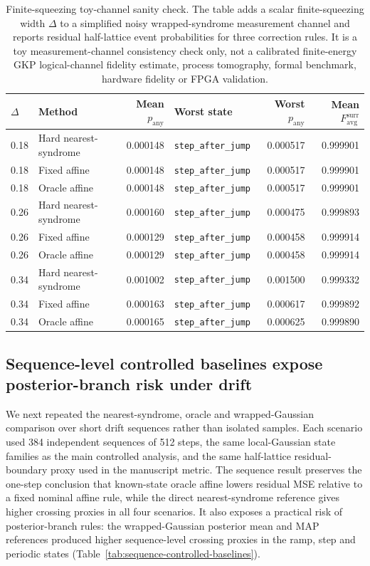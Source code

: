 \documentclass[11pt]{article}
\begin{document}
\begin{table}[t]
\centering
\small
\begin{tabular}{@{}llrlrr@{}}
\toprule
\(\Delta\) & Method & Mean \(p_{\mathrm{any}}\) & Worst state & Worst \(p_{\mathrm{any}}\) & Mean \(F_{\mathrm{avg}}^{\mathrm{surr}}\) \\
\midrule
0.18 & Hard nearest-syndrome & 0.000148 & \texttt{step\_after\_jump} & 0.000517 & 0.999901 \\
0.18 & Fixed affine & 0.000148 & \texttt{step\_after\_jump} & 0.000517 & 0.999901 \\
0.18 & Oracle affine & 0.000148 & \texttt{step\_after\_jump} & 0.000517 & 0.999901 \\
0.26 & Hard nearest-syndrome & 0.000160 & \texttt{step\_after\_jump} & 0.000475 & 0.999893 \\
0.26 & Fixed affine & 0.000129 & \texttt{step\_after\_jump} & 0.000458 & 0.999914 \\
0.26 & Oracle affine & 0.000129 & \texttt{step\_after\_jump} & 0.000458 & 0.999914 \\
0.34 & Hard nearest-syndrome & 0.001002 & \texttt{step\_after\_jump} & 0.001500 & 0.999332 \\
0.34 & Fixed affine & 0.000163 & \texttt{step\_after\_jump} & 0.000617 & 0.999892 \\
0.34 & Oracle affine & 0.000165 & \texttt{step\_after\_jump} & 0.000625 & 0.999890 \\
\bottomrule
\end{tabular}
\caption{Finite-squeezing toy-channel sanity check.  The table adds a scalar
finite-squeezing width \(\Delta\) to a simplified noisy wrapped-syndrome
measurement channel and reports residual half-lattice event probabilities for
three correction rules.  It is a toy measurement-channel consistency check
only, not a calibrated finite-energy GKP logical-channel fidelity estimate,
process tomography, formal benchmark, hardware fidelity or FPGA validation.}
\label{tab:finite-energy-channel-sanity}
\end{table}

\subsection{Sequence-level controlled baselines expose posterior-branch risk under drift}

We next repeated the nearest-syndrome, oracle and wrapped-Gaussian comparison over short drift
sequences rather than isolated samples.  Each scenario used 384 independent
sequences of 512 steps, the same local-Gaussian state families as the main
controlled analysis, and the same half-lattice residual-boundary proxy used in
the manuscript metric.  The sequence result preserves the one-step conclusion
that known-state oracle affine lowers residual MSE relative to a fixed nominal
affine rule, while the direct nearest-syndrome reference gives higher crossing
proxies in all four scenarios.  It also exposes a practical risk of
posterior-branch rules: the wrapped-Gaussian posterior mean and MAP references
produced higher sequence-level crossing proxies in the ramp, step and periodic states
(Table~\ref{tab:sequence-controlled-baselines}).
\end{document}
